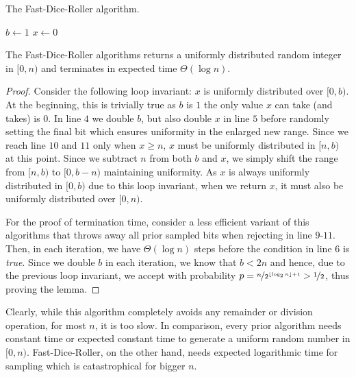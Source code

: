 \documentclass[a4paper, UKenglish, cleveref, autoref, thm-restate]{lipics-v2021}
\begin{document}
\begin{algorithm}[!htb] \label{alg:flips}
    \caption{The Fast-Dice-Roller algorithm.}
    $b \leftarrow 1$\;
    $x \leftarrow 0$\;
\end{algorithm}

\begin{lemma}
    The Fast-Dice-Roller algorithms returns a uniformly distributed random integer in $[0,n)$ and terminates in expected time $\Theta(\log n)$.
\end{lemma}
\begin{proof}
    Consider the following loop invariant: $x$ is uniformly distributed over $[0,b)$.
    At the beginning, this is trivially true as $b$ is $1$ the only value $x$ can take (and takes) is $0$.
    In line $4$ we double $b$, but also double $x$ in line $5$ before randomly setting the final bit which ensures uniformity in the enlarged new range.
    Since we reach line $10$ and $11$ only when $x \geq n$, $x$ must be uniformly distributed in $[n,b)$ at this point.
    Since we subtract $n$ from both $b$ and $x$, we simply shift the range from $[n,b)$ to $[0,b - n)$ maintaining uniformity.
    As $x$ is always uniformly distributed in $[0,b)$ due to this loop invariant, when we return $x$, it must also be uniformly distributed over $[0,n)$.

    For the proof of termination time, consider a less efficient variant of this algorithms that throws away all prior sampled bits when rejecting in line $9$-$11$.
    Then, in each iteration, we have $\Theta(\log n)$ steps before the condition in line $6$ is \emph{true}.
    Since we double $b$ in each iteration, we know that $b < 2n$ and hence, due to the previous loop invariant, we accept with probability $p = \nicefrac{n}{2^{\lfloor\log_2n\rfloor + 1}} > \nicefrac{1}{2}$, thus proving the lemma.
\end{proof}
Clearly, while this algorithm completely avoids any remainder or division operation, for most $n$, it is too slow.
In comparison, every prior algorithm needs constant time or expected constant time to generate a uniform random number in $[0,n)$.
Fast-Dice-Roller, on the other hand, needs expected logarithmic time for sampling which is catastrophical for bigger $n$.
\end{document}
